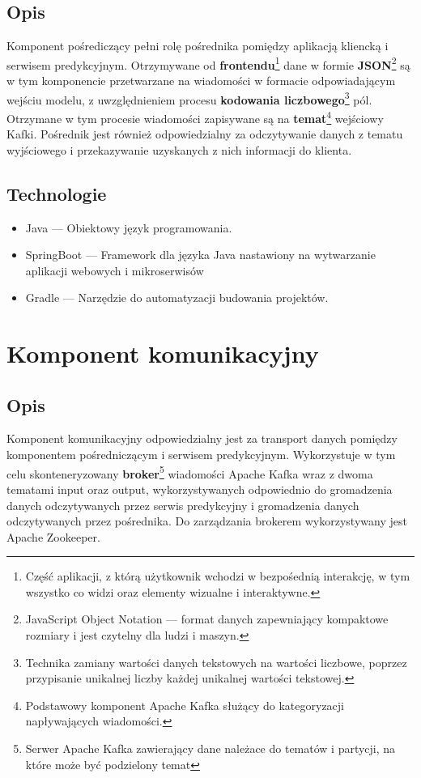 \documentclass[12pt, a4paper]{report}
\begin{document}
\section{Opis}
Komponent pośrediczący pełni rolę pośrednika pomiędzy aplikacją kliencką i serwisem predykcyjnym.
Otrzymywane od \textbf{frontendu}\footnote{Część aplikacji, z którą użytkownik wchodzi w bezpośednią interakcję, w tym wszystko co widzi oraz elementy wizualne i interaktywne.}
dane w formie \textbf{JSON}\footnote{JavaScript Object Notation --- format danych zapewniający kompaktowe rozmiary i jest czytelny dla ludzi i maszyn.}
są w tym komponencie przetwarzane na wiadomości w formacie odpowiadającym wejściu modelu, z uwzględnieniem procesu \textbf{kodowania liczbowego}\footnote{
Technika zamiany wartości danych tekstowych na wartości liczbowe, poprzez przypisanie unikalnej liczby każdej unikalnej wartości tekstowej.
} pól. Otrzymane w tym procesie wiadomości zapisywane są na \textbf{temat}\footnote{Podstawowy komponent Apache Kafka służący do kategoryzacji napływających wiadomości.}
 wejściowy Kafki. Pośrednik jest również odpowiedzialny za odczytywanie danych z tematu wyjściowego i
przekazywanie uzyskanych z nich informacji do klienta.
\section{Technologie}
\begin{itemize}
    \item Java --- Obiektowy język programowania.
    \item SpringBoot --- Framework dla języka Java nastawiony na wytwarzanie aplikacji webowych i mikroserwisów
    \item Gradle --- Narzędzie do automatyzacji budowania projektów.
\end{itemize}
\chapter{Komponent komunikacyjny}
\section{Opis}
Komponent komunikacyjny odpowiedzialny jest za transport danych pomiędzy komponentem pośredniczącym i serwisem predykcyjnym.
Wykorzystuje w tym celu skonteneryzowany \textbf{broker}\footnote{Serwer Apache Kafka zawierający dane należace do tematów i partycji, na które może być podzielony temat}
wiadomości Apache Kafka wraz z dwoma tematami input oraz output, wykorzystywanych
odpowiednio do gromadzenia danych odczytywanych przez serwis predykcyjny i gromadzenia danych odczytywanych przez pośrednika.
Do zarządzania brokerem wykorzystywany jest Apache Zookeeper.
\end{document}
